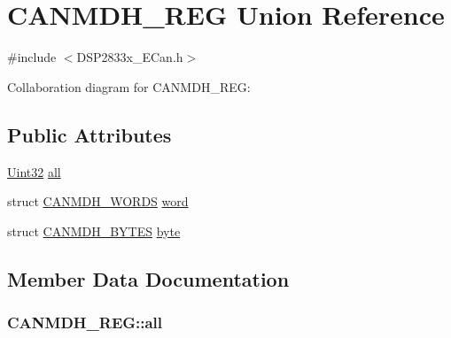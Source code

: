 \hypertarget{union_c_a_n_m_d_h___r_e_g}{}\section{C\+A\+N\+M\+D\+H\+\_\+\+R\+E\+G Union Reference}
\label{union_c_a_n_m_d_h___r_e_g}


{\ttfamily \#include $<$D\+S\+P2833x\+\_\+\+E\+Can.\+h$>$}



Collaboration diagram for C\+A\+N\+M\+D\+H\+\_\+\+R\+E\+G\+:
\subsection*{Public Attributes}
\begin{DoxyCompactItemize}
\item 
\hyperlink{_d_s_p2833x___device_8h_aba99025e657f892beb7ff31cecf64653}{Uint32} \hyperlink{union_c_a_n_m_d_h___r_e_g_a23b0307559a23aeabd603e01833b66ed}{all}
\item 
struct \hyperlink{struct_c_a_n_m_d_h___w_o_r_d_s}{C\+A\+N\+M\+D\+H\+\_\+\+W\+O\+R\+D\+S} \hyperlink{union_c_a_n_m_d_h___r_e_g_a4f5f9d12b59d5706e3b816bb548e4035}{word}
\item 
struct \hyperlink{struct_c_a_n_m_d_h___b_y_t_e_s}{C\+A\+N\+M\+D\+H\+\_\+\+B\+Y\+T\+E\+S} \hyperlink{union_c_a_n_m_d_h___r_e_g_a1e9652fe4fcf1d64bf3e863c9c4846d4}{byte}
\end{DoxyCompactItemize}


\subsection{Member Data Documentation}
\hypertarget{union_c_a_n_m_d_h___r_e_g_a23b0307559a23aeabd603e01833b66ed}{}
\subsubsection[{all}]{ C\+A\+N\+M\+D\+H\+\_\+\+R\+E\+G\+::all}\label{union_c_a_n_m_d_h___r_e_g_a23b0307559a23aeabd603e01833b66ed}
\hypertarget{union_c_a_n_m_d_h___r_e_g_a1e9652fe4fcf1d64bf3e863c9c4846d4}{}
